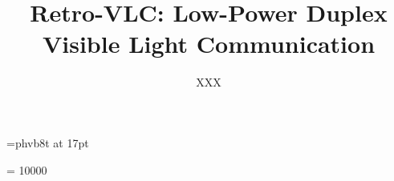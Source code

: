 \documentclass[letterpaper,twocolumn,10pt]{article}
\newcommand{\vitag} {ViTag}
\newcommand{\reader} {ViReader}
\newcommand{\retro} {Retro-VLC}
\begin{document}
\font\ttlfnt=phvb8t at 17pt

\title{\retro: Low-Power Duplex Visible Light Communication}

\newcommand{\supsym}[1]{\raisebox{6pt}{{\footnotesize #1}}}


\widowpenalty = 10000


\author{
XXX\\
}


\date{}
\maketitle

\begin{sloppypar}

\begin{abstract}

\end{abstract}








%






\let\oldthebibliography=\thebibliography
\let\endoldthebibliography=\endthebibliography
\renewenvironment{thebibliography}[1]{%
    \begin{oldthebibliography}{#1}%
      \setlength{\parskip}{0ex}%
      \setlength{\itemsep}{0ex}%
}%
{%
\end{oldthebibliography}%
}
{
\small


\begin{appendix}

\end{appendix}
}
\small
\end{sloppypar}
\end{document}
